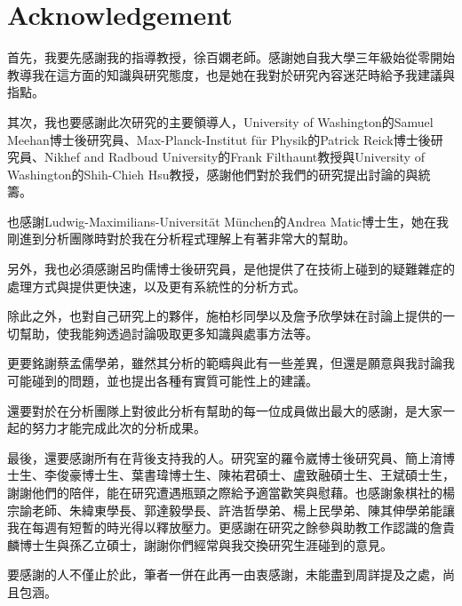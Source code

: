 \documentclass[class=NCU_thesis, crop=false]{standalone}
\begin{document}
\chapter{Acknowledgement}

首先，我要先感謝我的指導教授，徐百嫻老師。感謝她自我大學三年級始從零開始教導我在這方面的知識與研究態度，也是她在我對於研究內容迷茫時給予我建議與指點。

其次，我也要感謝此次研究的主要領導人，University of Washington的Samuel Meehan博士後研究員、Max-Planck-Institut f\"{u}r Physik的Patrick Reick博士後研究員、Nikhef and Radboud University的Frank Filthaunt教授與University of Washington的Shih-Chieh Hsu教授，感謝他們對於我們的研究提出討論的與統籌。

也感謝Ludwig-Maximilians-Universit\"{a}t M\"{u}nchen的Andrea Matic博士生，她在我剛進到分析團隊時對於我在分析程式理解上有著非常大的幫助。

另外，我也必須感謝呂昀儒博士後研究員，是他提供了在技術上碰到的疑難雜症的處理方式與提供更快速，以及更有系統性的分析方式。

除此之外，也對自己研究上的夥伴，施柏杉同學以及詹予欣學妹在討論上提供的一切幫助，使我能夠透過討論吸取更多知識與處事方法等。

更要銘謝蔡孟儒學弟，雖然其分析的範疇與此有一些差異，但還是願意與我討論我可能碰到的問題，並也提出各種有實質可能性上的建議。

還要對於在分析團隊上對彼此分析有幫助的每一位成員做出最大的感謝，是大家一起的努力才能完成此次的分析成果。

最後，還要感謝所有在背後支持我的人。研究室的羅令崴博士後研究員、簡上淯博士生、李俊豪博士生、葉書瑋博士生、陳祐君碩士、盧致融碩士生、王斌碩士生，謝謝他們的陪伴，能在研究遭遇瓶頸之際給予適當歡笑與慰藉。也感謝象棋社的楊宗諭老師、朱緯東學長、郭達毅學長、許浩哲學弟、楊上民學弟、陳其伸學弟能讓我在每週有短暫的時光得以釋放壓力。更感謝在研究之餘參與助教工作認識的詹貴麟博士生與孫乙立碩士，謝謝你們經常與我交換研究生涯碰到的意見。

要感謝的人不僅止於此，筆者一併在此再一由衷感謝，未能盡到周詳提及之處，尚且包涵。
\end{document}
